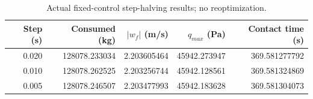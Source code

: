 \begin{table}[htbp]
\centering\small
\caption{Actual fixed-control step-halving results; no reoptimization.}
\label{tab:convergence}
\begin{tabularx}{\linewidth}{@{}rrrrr@{}}
\toprule
Step (s) & Consumed (kg) & $|w_f|$ (m/s) & $q_{max}$ (Pa) & Contact time (s) \\
\midrule
0.020 & 128078.233034 & 2.203605464 & 45942.273947 & 369.581277792 \\
0.010 & 128078.262525 & 2.203256744 & 45942.128561 & 369.581324869 \\
0.005 & 128078.246507 & 2.203477993 & 45942.183628 & 369.581304073 \\
\bottomrule
\end{tabularx}
\par{}
\end{table}
